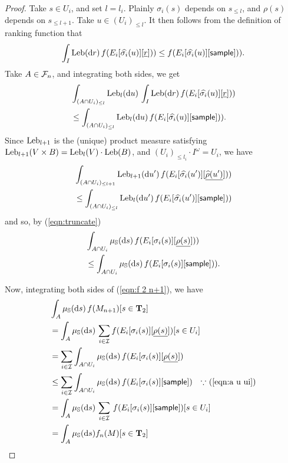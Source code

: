 \begin{proof}
Take $s \in U_i$, and set $l = l_i$.
Plainly $\sigma_i(s)$ depends on $s_{\leq l}$, and $\rho(s)$ depends on $s_{\leq l +1}$.
Take $u \in (U_i)_{\leq l}$.
It then follows from the definition of ranking function that
\[%
\int_I \Leb(\dif r) \, f(E_i[\widehat{\sigma_i}(u)][\underline{r}])) \leq f(E_i[\widehat{\sigma_i}(u)][\tsample])).
\]
Take $A \in \mathcal{F}_n$, and integrating both sides, we get
\begin{align*}
& \int_{(A \cap U_i)_{\leq l}} \mathrm{Leb}_l(\mathrm{d} u) \, \int_I \textrm{Leb}(\mathrm{d} r) \, f(E_i[\widehat{\sigma_i}(u)][\underline{r}])) \\
& \leq \int_{(A \cap U_i)_{\leq l}} \mathrm{Leb}_l(\mathrm{d} u) \, f(E_i[\widehat{\sigma_i}(u)][\mathsf{sample}])).
\end{align*}
Since $\mathrm{Leb}_{l+1}$ is the (unique) product measure satisfying $\mathrm{Leb}_{l+1}(V \times B) = \mathrm{Leb}_l(V) \cdot \mathrm{Leb}(B)$, and $(U_i)_{\leq l_i} \cdot I^\omega = U_i$, we have
\begin{align*}
& \int_{(A \cap U_i)_{\leq l+1}} \mathrm{Leb}_{l+1}(\mathrm{d} u') \, f(E_i[\widehat{\sigma_i}(u')][\underline{\widehat{\rho}(u')}])) \\
& \leq 
\int_{(A \cap U_i)_{\leq l}} \mathrm{Leb}_l(\mathrm{d} u') \, f(E_i[\widehat{\sigma_i}(u')][\mathsf{sample}]))
\end{align*}
and so, by (\ref{eqn:truncate})
\begin{align}
& \int_{A \cap U_i} \mu_{\entrosp}(\dif s) \, f(E_i[\sigma_i(s)][\underline{\rho(s)}])) \nonumber \\
& \leq 
\int_{A \cap U_i} \mu_{\entrosp}(\dif s) \, f(E_i[\sigma_i(s)][\tsample])).
\label{eqn:a u ui}
\end{align}

Now, integrating both sides of (\ref{eqn:f 2 n+1}), we have
\begin{align*}
& \int_A \mu_{{\mathbb{S}}}(\mathrm{d} s) \, f(M_{n+1})[s \in \mathbf{T}_2] \\
&= 
\int_A \mu_{{\mathbb{S}}}(\mathrm{d} s) \, \sum_{i \in \mathcal{I}} f(E_i[\sigma_i(s)][\underline{\rho(s)}])[s \in U_i] \\
&= 
\sum_{i \in \mathcal{I}} \int_{A \cap U_i} \mu_{{\mathbb{S}}}(\mathrm{d} s) \, f(E_i[\sigma_i(s)][\underline{\rho(s)}])\\
&\leq 
\sum_{i \in \mathcal{I}} \int_{A \cap U_i} \mu_{{\mathbb{S}}}(\mathrm{d} s) \, f(E_i[\sigma_i(s)][\mathsf{sample}])
\quad \hbox{$\because$ (\ref{eqn:a u ui})}\\
&= 
\int_{A} \mu_{{\mathbb{S}}}(\mathrm{d} s) \, \sum_{i \in \mathcal{I}} \, f(E_i[\sigma_i(s)][\mathsf{sample}])[s \in U_i]\\
&= \int_{A} \mu_{{\mathbb{S}}}(\mathrm{d} s) f_{n}(M)[s \in \mathbf{T}_2]
\end{align*}

\end{proof}

